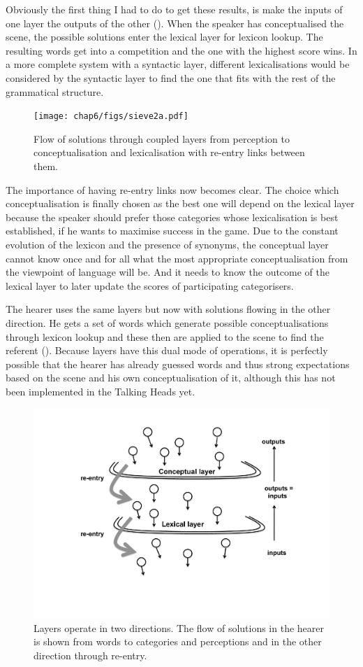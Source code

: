 Obviously the first thing I had to do to get 
these results, is make the inputs of one layer the
outputs of the other (). When the 
speaker has conceptualised the scene, the possible
solutions enter the lexical layer for lexicon lookup. 
The resulting words get into a competition and the 
one with the highest score wins. In a more complete
system with a syntactic layer, different lexicalisations
would be considered by the syntactic layer to find 
the one that fits with the rest of the grammatical 
structure. 


\begin{figure}[htbp]
  \centerline{\texttt{[image: chap6/figs/sieve2a.pdf]}}
\caption{\label{sieve2a}Flow of solutions through 
coupled layers from perception to conceptualisation and lexicalisation with re-entry links between them.} 
\end{figure}

The importance of having re-entry links now becomes
clear. The choice which conceptualisation is finally chosen 
as the best one will depend on the lexical layer because 
the speaker should prefer those categories whose 
lexicalisation is best established, if he wants to 
maximise success in the game. Due to the constant evolution
of the lexicon and the presence of synonyms, the conceptual
layer cannot know once and for all what the most
appropriate conceptualisation from the viewpoint of 
language will be. And it needs to know the outcome of the
lexical layer to later update the scores of participating
categorisers. 

The hearer uses the same layers but now with solutions
flowing in the other direction. He gets a set of words
which generate possible conceptualisations through 
lexicon lookup and these then are applied to the 
scene to find the referent (). Because 
layers have this dual mode of operations, it is perfectly 
possible that the hearer has already guessed words and 
thus strong expectations based on the scene and his 
own conceptualisation of it, although this has not been
implemented in the Talking Heads yet. 


\begin{figure}[htbp]
  \centerline{\includegraphics[width=.65\textwidth]{chap6/figs/sieve2b.pdf}}
\caption{\label{sieve2b}Layers operate in two 
directions. The flow of solutions in the hearer is shown from words to categories and perceptions
and in the other direction through re-entry.}
\end{figure}

